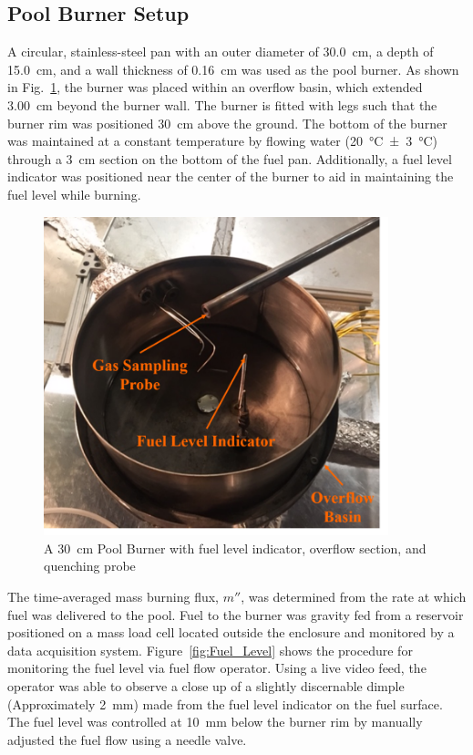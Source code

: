 \documentclass[12pt]{article}
\begin{document}
\subsection{Pool Burner Setup}
\label{ssec:Pool_Burner_Setup}
A circular, stainless-steel pan with an outer diameter of 30.0~\si{cm}, a depth of 15.0~\si{cm}, and a wall thickness of 0.16~\si{cm} was used as the pool burner. As shown in Fig.~\ref{fig:Pool Burner}, the burner was placed within an overflow basin, which extended 3.00~\si{cm} beyond the burner wall. The burner is fitted with legs such that the burner rim was positioned 30~\si{cm} above the ground. The bottom of the burner was maintained at a constant temperature by flowing water (20~°\si{C}~±~3~°\si{C}) through a 3~\si{cm} section on the bottom of the fuel pan. Additionally, a fuel level indicator was positioned near the center of the burner to aid in maintaining the fuel level while burning.

\begin{figure}[h!]
	\centering
\includegraphics[width=10.0cm,keepaspectratio]{Pool_Burner.png}
	\caption[Pool Burner Design]{A 30~\si{cm} Pool Burner with fuel level indicator, overflow section, and quenching probe}
	\label{fig:Pool Burner}
\end{figure}

The time-averaged mass burning flux, $m''$, was determined from the rate at which fuel was delivered to the pool. Fuel to the burner was gravity fed from a reservoir positioned on a mass load cell located outside the enclosure and monitored by a data acquisition system. Figure~\ref{fig:Fuel_Level} shows the procedure for monitoring the fuel level via fuel flow operator. Using a live video feed, the operator was able to observe a close up of a slightly discernable dimple (Approximately 2~\si{mm}) made from the fuel level indicator on the fuel surface. The fuel level was controlled at 10~\si{mm} below the burner rim by manually adjusted the fuel flow using a needle valve.
\end{document}
